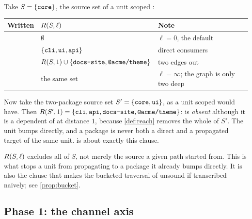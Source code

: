 \begin{example}
\label{ex:reach}
Take $S = \{\texttt{core}\}$, the source set of a unit scoped :

\begin{center}\small
\begin{tabular}{@{}L{2.6cm}L{5.4cm}L{4.6cm}@{}}
\toprule
Written & $R(S,\ell)$ & Note \\
\midrule
{} & $\emptyset$ & $\ell = 0$, the default \\
 & $\{\texttt{cli},\texttt{ui},\texttt{api}\}$ & direct consumers \\
 & $R(S,1) \cup \{\texttt{docs-site},\texttt{@acme/theme}\}$ & two edges out \\
 & the same set & $\ell = \infty$; the graph is only two deep \\
\bottomrule
\end{tabular}
\end{center}
Now take the two-package source set $S' = \{\texttt{core},\texttt{ui}\}$, as a unit
scoped  would have. Then $R(S',1) =
\{\texttt{cli},\texttt{api},\texttt{docs-site},\texttt{@acme/theme}\}$:  is
\emph{absent} although it is a dependent of  at distance $1$,
because \cref{def:reach} removes the whole of $S'$. The unit bumps 
directly, and a package is never both a direct and a propagated target of the
same unit.  is about exactly this clause.
\end{example}

\begin{remark}
\label{rem:selfex}
$R(S,\ell)$ excludes all of $S$, not merely the source a given path
started from. This is what stops a unit from propagating to a package it
already bumps directly. It is also the clause that makes the bucketed traversal
of  unsound if transcribed naively; see \cref{prop:bucket}.
\end{remark}

\subsection{Phase 1: the channel axis}

